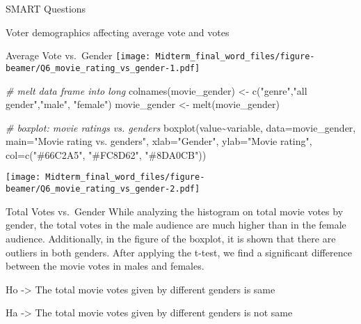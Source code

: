 \documentclass[
  ignorenonframetext,
]{beamer}
\newenvironment{Shaded}{\begin{snugshade}}{\end{snugshade}}
\newcommand{\AttributeTok}[1]{\textcolor[rgb]{0.77,0.63,0.00}{#1}}
\newcommand{\CommentTok}[1]{\textcolor[rgb]{0.56,0.35,0.01}{\textit{#1}}}
\newcommand{\DecValTok}[1]{\textcolor[rgb]{0.00,0.00,0.81}{#1}}
\newcommand{\FunctionTok}[1]{\textcolor[rgb]{0.00,0.00,0.00}{#1}}
\newcommand{\NormalTok}[1]{#1}
\newcommand{\OtherTok}[1]{\textcolor[rgb]{0.56,0.35,0.01}{#1}}
\newcommand{\SpecialCharTok}[1]{\textcolor[rgb]{0.00,0.00,0.00}{#1}}
\newcommand{\StringTok}[1]{\textcolor[rgb]{0.31,0.60,0.02}{#1}}
\begin{document}
\begin{frame}[fragile]{SMART Questions}
\begin{block}{Voter demographics affecting average vote and votes}
\begin{block}{Average Vote vs.~Gender}
\texttt{[image: Midterm\_final\_word\_files/figure-beamer/Q6\_movie\_rating\_vs\_gender-1.pdf]}

\begin{Shaded}
\begin{Highlighting}[]
\CommentTok{\# melt data frame into long}
\FunctionTok{colnames}\NormalTok{(movie\_gender) }\OtherTok{\textless{}{-}} \FunctionTok{c}\NormalTok{(}\StringTok{"genre"}\NormalTok{,}\StringTok{"all gender"}\NormalTok{,}\StringTok{"male"}\NormalTok{, }\StringTok{"female"}\NormalTok{)}
\NormalTok{movie\_gender }\OtherTok{\textless{}{-}} \FunctionTok{melt}\NormalTok{(movie\_gender)}

\CommentTok{\# boxplot: movie ratings vs. genders}
\FunctionTok{boxplot}\NormalTok{(value}\SpecialCharTok{\textasciitilde{}}\NormalTok{variable, }\AttributeTok{data=}\NormalTok{movie\_gender, }\AttributeTok{main=}\StringTok{"Movie rating vs. genders"}\NormalTok{, }\AttributeTok{xlab=}\StringTok{"Gender"}\NormalTok{, }\AttributeTok{ylab=}\StringTok{"Movie rating"}\NormalTok{, }\AttributeTok{col=}\FunctionTok{c}\NormalTok{(}\StringTok{"\#66C2A5"}\NormalTok{, }\StringTok{"\#FC8D62"}\NormalTok{, }\StringTok{"\#8DA0CB"}\NormalTok{)) }
\end{Highlighting}
\end{Shaded}

\texttt{[image: Midterm\_final\_word\_files/figure-beamer/Q6\_movie\_rating\_vs\_gender-2.pdf]}
\end{block}

\begin{block}{Total Votes vs.~Gender}
\protect\hypertarget{total-votes-vs.-gender}{}
While analyzing the histogram on total movie votes by gender, the total
votes in the male audience are much higher than in the female audience.
Additionally, in the figure of the boxplot, it is shown that there are
outliers in both genders. After applying the t-test, we find a
significant difference between the movie votes in males and females.

Ho -\textgreater{} The total movie votes given by different genders is
same

Ha -\textgreater{} The total movie votes given by different genders is
not same

\begin{Shaded}
\end{Shaded}
\end{block}
\end{block}
\end{frame}
\end{document}
